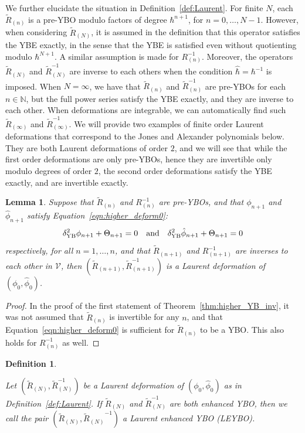 \documentclass[11pt,fleqn]{amsart} %
\newtheorem{lemma}[theorem]{Lemma}
\newtheorem{definition}[theorem]{Definition}
\begin{document}
We further elucidate the situation in Definition~\ref{def:Laurent}. For finite $N$, each $\tilde R_{(n)}$ is a pre-YBO modulo factors of degree $\hbar^{n+1}$, for $n=0, \ldots, N-1$. However, 
when considering $\tilde  R_{(N)}$, 
 it is assumed in the definition that 
this operator satisfies the YBE exactly, in the sense that the YBE is satisfied even without quotienting modulo $\hbar^{N+1}$. 
A similar assumption is made for $R^{-1}_{(n)}$. Moreover, the operators $\tilde R_{(N)}$ and $\tilde  R^{-1}_{(N)}$ are inverse to each others when the condition $\hat \hbar = \hbar^{-1}$ is imposed. When $N=\infty$, we have that $\tilde  R_{(n)}$ and $\tilde  R^{-1}_{(n)}$ are pre-YBOs for each $n\in \mathbb N$, but the full power series satisfy the  YBE exactly, and they are inverse to each other. When deformations are integrable, we can automatically find such $\tilde  R_{(\infty)}$ and $\tilde  R^{-1}_{(\infty)}$. We will provide two examples of finite order Laurent deformations that correspond to the Jones and Alexander polynomials below. They are both Laurent deformations of order $2$, and we will see that while the first order deformations are only pre-YBOs, hence they are invertible only modulo degrees of order $2$, the second order deformations satisfy the YBE exactly, and are invertible exactly. 


\begin{lemma}
Suppose that 
$\tilde R_{(n)}$ and $R^{-1}_{(n)}$ 
are pre-YBOs, and that $\phi_{n+1}$ and
$\hat \phi_{n+1} $ satisfy Equation~\ref{eqn:higher_deform0}:
	$$\delta^2_{\rm YB}\phi_{n+1} + \Theta_{n+1} = 0 \quad {\rm and } \quad \delta^2_{\rm YB}\hat \phi_{n+1} + \Theta_{n+1} = 0$$
respectively, for all $n=1, \ldots, n$, and that $\tilde R_{(n+1)}$ and $R^{-1}_{(n+1)}$ are inverses to each other in $\mathcal V$,
then $( \tilde R_{(n+1)}, \tilde R^{-1}_{(n+1)}  )$ is a Laurent deformation of $(\phi_0, \hat \phi_0)$.
\end{lemma}

\begin{proof}
In the proof of the first statement of Theorem~\ref{thm:higher_YB_inv}, it was not assumed that $\tilde R_{(n)}$ is 
invertible for any $n$, and that Equation~\eqref{eqn:higher_deform0} is sufficient for $\tilde R_{(n)}$
to be a YBO. This also holds for $R^{-1}_{(n)}$ as well. 
\end{proof}


\begin{definition}\label{def:ELaurent}
{\rm

Let $(\tilde R_{(N)}, \tilde R^{-1}_{(N)})$ be a Laurent deformation of $(\phi_0, \hat \phi_0)$ as in Definition~\ref{def:Laurent}.
If $\tilde R_{(N)}$ and $\tilde R^{-1}_{(N)}$ are both enhanced YBO, then we call the pair 
$(\tilde R_{(N)}, {\tilde R_{(N)}}^{-1} )$ a {\it Laurent enhanced YBO (LEYBO)}.
}
\end{definition}
\end{document}

